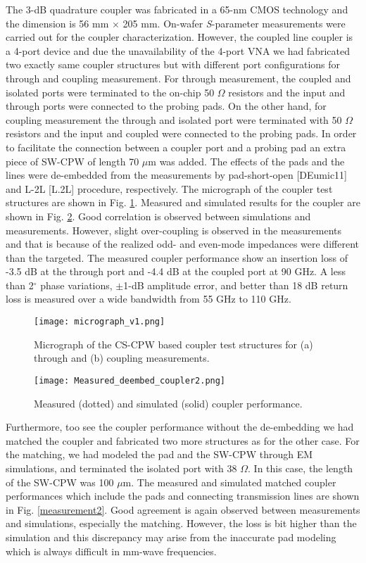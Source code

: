 \documentclass[journal]{IEEEtran}
\begin{document}
The 3-dB quadrature coupler was fabricated in a 65-nm CMOS technology and the dimension is 56 mm $\times$ 205 mm. On-wafer \textit{S}-parameter measurements were carried out for the coupler characterization. However, the coupled line coupler is a 4-port device and due the unavailability of the 4-port VNA we had fabricated two exactly same coupler structures but with different port configurations for through and coupling measurement. For through measurement, the coupled and isolated ports were terminated to the on-chip 50 $\Omega$ resistors and the input and through ports were connected to the probing pads. On the other hand, for coupling measurement the through and isolated port were terminated with 50 $\Omega$ resistors and the input and coupled were connected to
the probing pads. In order to facilitate the connection between a coupler port and a probing pad an extra piece of SW-CPW of length 70 $\mu$m was added. The effects of the pads and the lines were de-embedded from the measurements by pad-short-open [DEumic11] and L-2L [L.2L] procedure, respectively. The micrograph of the coupler test structures are shown in Fig. \ref{micrograph}. Measured and simulated results for the coupler are shown in Fig. \ref{measurement1}. Good correlation is observed between simulations and measurements. However, slight over-coupling is observed in the measurements and
that is because of the realized odd- and even-mode impedances were different than the targeted. The measured coupler performance show an insertion loss of -3.5 dB at the through port and -4.4 dB at the coupled port at 90 GHz. A less than 2$^\circ$ phase variations, $\pm$1-dB amplitude error, and better than 18 dB return loss is measured over a wide bandwidth from 55 GHz to 110 GHz.

\begin{figure}
	\texttt{[image: micrograph\_v1.png]}
	\caption{Micrograph of the CS-CPW based coupler test structures for (a) through and (b) coupling measurements.}
	\label{micrograph}
\end{figure}

\begin{figure}
	\texttt{[image: Measured\_deembed\_coupler2.png]}
	\caption{Measured (dotted) and simulated (solid) coupler performance.}
	\label{measurement1}
\end{figure}

Furthermore, too see the coupler performance without the de-embedding we had matched the
coupler and fabricated two more structures as for the other case. For the matching, we had modeled the pad and the SW-CPW through EM simulations, and terminated the isolated port with 38 $\Omega$. In this case, the length of the SW-CPW was 100 $\mu$m. The measured and simulated matched coupler performances which include the pads and connecting transmission lines are shown in Fig. \ref{measurement2}. Good agreement is again observed between measurements and simulations, especially the matching. However, the loss is bit higher than the simulation and this discrepancy may arise from the inaccurate pad modeling which is always difficult in mm-wave frequencies.
\end{document}
